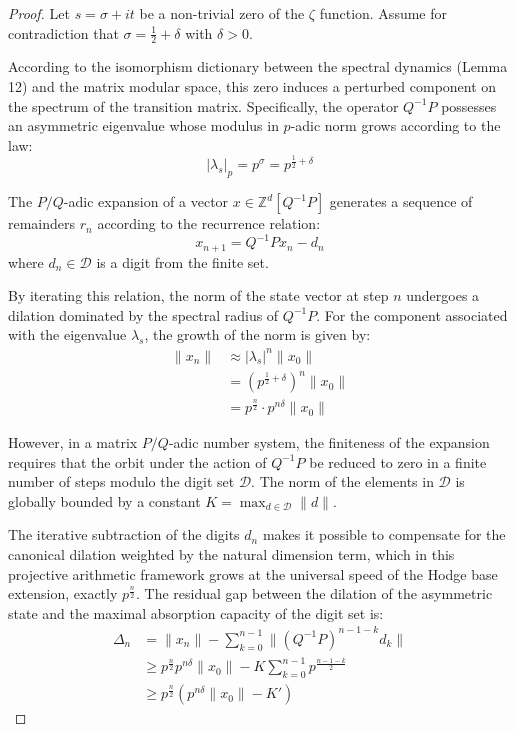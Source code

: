 \documentclass[
]{article}
\begin{document}
\begin{proof}
Let $s = \sigma + it$ be a non-trivial zero of the $\zeta$ function. Assume for contradiction that $\sigma = \frac{1}{2} + \delta$ with $\delta > 0$.

According to the isomorphism dictionary between the spectral dynamics (Lemma 12) and the matrix modular space, this zero induces a perturbed component on the spectrum of the transition matrix. Specifically, the operator $Q^{-1}P$ possesses an asymmetric eigenvalue whose modulus in $p$-adic norm grows according to the law:
\begin{equation*}
    |\lambda_s|_p = p^{\sigma} = p^{\frac{1}{2} + \delta}
\end{equation*}

The $P/Q$-adic expansion of a vector $x \in \mathbb{Z}^d[Q^{-1}P]$ generates a sequence of remainders $r_n$ according to the recurrence relation:
\begin{equation*}
    x_{n+1} = Q^{-1}P x_n - d_n
\end{equation*}
where $d_n \in \mathcal{D}$ is a digit from the finite set.

By iterating this relation, the norm of the state vector at step $n$ undergoes a dilation dominated by the spectral radius of $Q^{-1}P$. For the component associated with the eigenvalue $\lambda_s$, the growth of the norm is given by:
\begin{align*}
    \|x_n\| &\approx |\lambda_s|^n \|x_0\| \\
            &= \left( p^{\frac{1}{2} + \delta} \right)^n \|x_0\| \\
            &= p^{\frac{n}{2}} \cdot p^{n\delta} \|x_0\|
\end{align*}

However, in a matrix $P/Q$-adic number system, the finiteness of the expansion requires that the orbit under the action of $Q^{-1}P$ be reduced to zero in a finite number of steps modulo the digit set $\mathcal{D}$. The norm of the elements in $\mathcal{D}$ is globally bounded by a constant $K = \max_{d \in \mathcal{D}} \|d\|$.

The iterative subtraction of the digits $d_n$ makes it possible to compensate for the canonical dilation weighted by the natural dimension term, which in this projective arithmetic framework grows at the universal speed of the Hodge base extension, exactly $p^{\frac{n}{2}}$.
The residual gap between the dilation of the asymmetric state and the maximal absorption capacity of the digit set is:
\begin{align*}
    \Delta_n &= \|x_n\| - \sum_{k=0}^{n-1} \|(Q^{-1}P)^{n-1-k} d_k\| \\
    &\ge p^{\frac{n}{2}} p^{n\delta} \|x_0\| - K \sum_{k=0}^{n-1} p^{\frac{n-1-k}{2}} \\
    &\ge p^{\frac{n}{2}} \left( p^{n\delta} \|x_0\| - K' \right)
\end{align*}


\end{proof}
\end{document}
